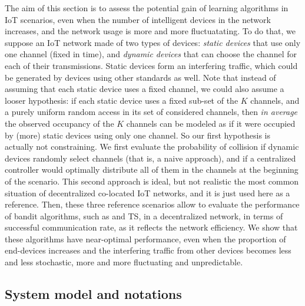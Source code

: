 The aim of this section is to assess the potential gain of learning algorithms in IoT scenarios, even when the number of intelligent devices in the network increases,
and the network usage is more and more fluctuatating.
To do that, we suppose an IoT network made of two types of devices: \emph{static devices} that use only one channel (fixed in time), and \emph{dynamic devices} that can choose the channel for each of their transmissions. Static devices form an interfering traffic, which could be generated by devices using other standards as well.
Note that instead of assuming that each static device uses a fixed channel, we could also assume a looser hypothesis: if each static device uses a fixed sub-set of the $K$ channels, and a purely uniform random access in its set of considered channels, then \emph{in average} the observed occupancy of the $K$ channels can be modeled as if it were occupied by (more) static devices using only one channel. So our first hypothesis is actually not constraining.
We first evaluate the probability of collision if dynamic devices randomly select channels (that is, a naive approach), and if a centralized controller would optimally distribute all of them in the channels at the beginning of the scenario.
This second approach is ideal, but not realistic the most common situation of decentralized co-located IoT networks, and it is just used here as a reference.
Then, these three reference scenarios allow to evaluate the performance of bandit algorithms, such as \UCB{} and TS, in a decentralized network, in terms of successful communication rate, as it reflects the network efficiency.
We show that these algorithms have near-optimal performance, even when the proportion of end-devices increases and the interfering traffic from other devices becomes less and less stochastic, more and more fluctuating and unpredictable.




\subsection{System model and notations}\label{sub:41:systemModel}


